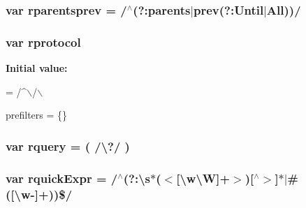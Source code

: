 \subsubsection[{\texorpdfstring{rparentsprev}{rparentsprev}}]{\setlength{\rightskip}{0pt plus 5cm}var rparentsprev = /$^\wedge$(?\+:parents$\vert$prev(?\+:Until$\vert$All))/}\hypertarget{jquery-3_82_81_8js_a901301fe926fd08a05236505bcde40ac}{}\label{jquery-3_82_81_8js_a901301fe926fd08a05236505bcde40ac}
\subsubsection[{\texorpdfstring{rprotocol}{rprotocol}}]{\setlength{\rightskip}{0pt plus 5cm}var rprotocol}\hypertarget{jquery-3_82_81_8js_a0f02b710647fcf95e74593954fb9b4cb}{}\label{jquery-3_82_81_8js_a0f02b710647fcf95e74593954fb9b4cb}
{\bfseries Initial value\+:}
\begin{DoxyCode}
= /^\(\backslash\)/\(\backslash\)

    
    prefilters = \{\}
\end{DoxyCode}
\subsubsection[{\texorpdfstring{rquery}{rquery}}]{\setlength{\rightskip}{0pt plus 5cm}var rquery = ( /\textbackslash{}?/ )}\hypertarget{jquery-3_82_81_8js_a2703be63c6fa8b050aa8381bf97513c6}{}\label{jquery-3_82_81_8js_a2703be63c6fa8b050aa8381bf97513c6}
\subsubsection[{\texorpdfstring{rquick\+Expr}{rquickExpr}}]{\setlength{\rightskip}{0pt plus 5cm}var rquick\+Expr = /$^\wedge$(?\+:\textbackslash{}s$\ast$($<$\mbox{[}\textbackslash{}w\textbackslash{}W\mbox{]}+$>$)\mbox{[}$^\wedge$$>$\mbox{]}$\ast$$\vert$\#(\mbox{[}\textbackslash{}w-\/\mbox{]}+))\$/}\hypertarget{jquery-3_82_81_8js_adb9a8b088e9580cb8ce6d9d4d08305ae}{}\label{jquery-3_82_81_8js_adb9a8b088e9580cb8ce6d9d4d08305ae}
